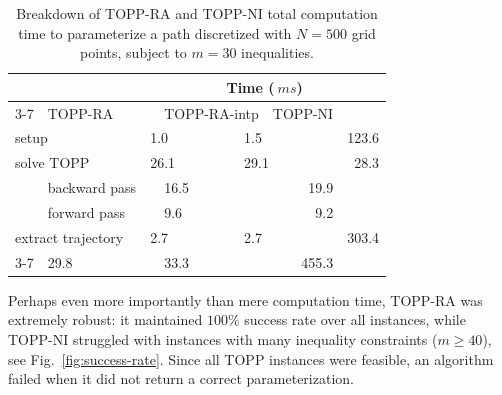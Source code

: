 \documentclass[journal]{IEEEtran}
\theoremstyle{plain}
\theoremstyle{definition}
\theoremstyle{definition}
\begin{document}

\begin{table}[htp]
  \caption{Breakdown of TOPP-RA and TOPP-NI total computation time to
    parameterize a path discretized with $N=500$ grid points, subject
    to $m=30$ inequalities.}
  \label{tab:computation-time}
  \centering
  \begin{tabular}{lllllrr}
    \toprule
    & & \multicolumn{5}{c}{Time ($\SI{}{ms}$)} \\
    \cmidrule{3-7}
    \multicolumn{2}{l}{}               &  \multicolumn{2}{l}{TOPP-RA} & \multicolumn{2}{l}{TOPP-RA-intp} & TOPP-NI	      \\
    \midrule
    \multicolumn{2}{l}{setup}          &  \multicolumn{2}{l}{1.0}     & \multicolumn{2}{l}{1.5}          & 123.6  \\
    \multicolumn{2}{l}{solve TOPP}     &  \multicolumn{2}{l}{26.1}    & \multicolumn{2}{l}{29.1}          & 28.3    \\
                         & backward pass&  & 16.5&   & 19.9&   \\
                         & forward pass &  & 9.6&   & 9.2&    \\
    \multicolumn{2}{l}{extract trajectory}& \multicolumn{2}{l}{2.7} & \multicolumn{2}{l}{2.7} & 303.4\\
    \cmidrule{3-7}
    \multicolumn{2}{l}{total} & \multicolumn{2}{l}{29.8} & \multicolumn{2}{l}{33.3} & 455.3\\
    \bottomrule
  \end{tabular}
\end{table}

Perhaps even more importantly than mere computation time, TOPP-RA was
extremely robust: it maintained $100\%$ success rate over all
instances, while TOPP-NI struggled with instances with many inequality
constraints ($m\geq 40$), see Fig.~\ref{fig:success-rate}. Since all
TOPP instances were feasible, an algorithm failed when it did not
return a correct parameterization.
\end{document}
